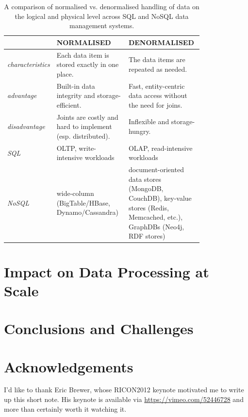 \documentclass{llncs}
\begin{document}
\begin{center}
\begin{table}
\caption{A comparison of normalised vs. denormalised handling of data on the 
logical and physical level across SQL and NoSQL data management systems.}
\label{tab:ndcomparison}
\begin{tabular}{l @{\hskip 2mm} p{0.40\linewidth} @{\hskip 5mm}
	            p{0.40\linewidth} @{\hskip 2mm}}
& \textbf{NORMALISED}& \textbf{DENORMALISED}\\
\hline
\hline
\emph{characteristics}&
Each data item is stored exactly in one place.&
The data items are repeated as needed.\\
\hline
\emph{advantage}&
Built-in data integrity and storage-efficient.&
Fast, entity-centric data access without the need for joins.\\
\hline
\emph{disadvantage} &
Joints are costly and hard to implement (esp. distributed).&
Inflexible and storage-hungry.\\
\hline
\hline
\emph{SQL} &
OLTP, write-intensive workloads &
OLAP, read-intensive workloads\\
\hline
\emph{NoSQL} &
wide-column (BigTable/HBase, Dynamo/Cassandra) &
document-oriented data stores (MongoDB, CouchDB), key-value stores (Redis, 
Memcached, etc.), GraphDBs (Neo4j, RDF stores)\\
\hline
\hline
\end{tabular}
\centering
\end{table}
\end{center}


\section{Impact on Data Processing at Scale}
\label{sec:ldp}


\section{Conclusions and Challenges}
\label{sec:concl}

\section{Acknowledgements}
\label{sec:ack}
I'd like to thank Eric Brewer, whose RICON2012 keynote motivated me to write up
this short note. His keynote is available via \url{https://vimeo.com/52446728} 
and more than certainly worth it watching it.



\end{document}
